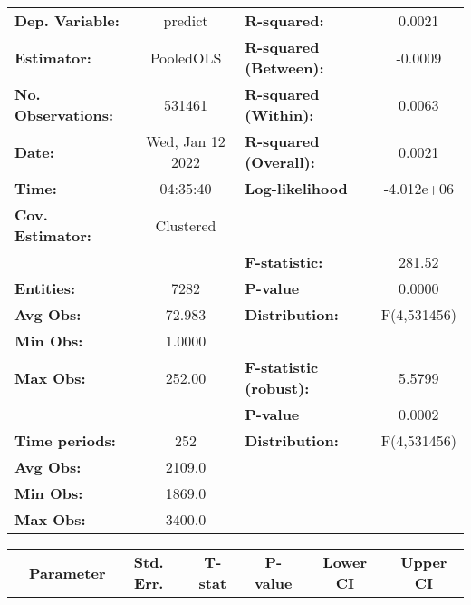 \begin{center}
\begin{tabular}{lclc}
\toprule
\textbf{Dep. Variable:}    &      predict       & \textbf{  R-squared:         }   &      0.0021      \\
\textbf{Estimator:}        &     PooledOLS      & \textbf{  R-squared (Between):}  &     -0.0009      \\
\textbf{No. Observations:} &       531461       & \textbf{  R-squared (Within):}   &      0.0063      \\
\textbf{Date:}             &  Wed, Jan 12 2022  & \textbf{  R-squared (Overall):}  &      0.0021      \\
\textbf{Time:}             &      04:35:40      & \textbf{  Log-likelihood     }   &    -4.012e+06    \\
\textbf{Cov. Estimator:}   &     Clustered      & \textbf{                     }   &                  \\
\textbf{}                  &                    & \textbf{  F-statistic:       }   &      281.52      \\
\textbf{Entities:}         &        7282        & \textbf{  P-value            }   &      0.0000      \\
\textbf{Avg Obs:}          &       72.983       & \textbf{  Distribution:      }   &   F(4,531456)    \\
\textbf{Min Obs:}          &       1.0000       & \textbf{                     }   &                  \\
\textbf{Max Obs:}          &       252.00       & \textbf{  F-statistic (robust):} &      5.5799      \\
\textbf{}                  &                    & \textbf{  P-value            }   &      0.0002      \\
\textbf{Time periods:}     &        252         & \textbf{  Distribution:      }   &   F(4,531456)    \\
\textbf{Avg Obs:}          &       2109.0       & \textbf{                     }   &                  \\
\textbf{Min Obs:}          &       1869.0       & \textbf{                     }   &                  \\
\textbf{Max Obs:}          &       3400.0       & \textbf{                     }   &                  \\
\bottomrule
\end{tabular}
\begin{tabular}{lcccccc}
                & \textbf{Parameter} & \textbf{Std. Err.} & \textbf{T-stat} & \textbf{P-value} & \textbf{Lower CI} & \textbf{Upper CI}  \\

\end{tabular}
\end{center}
